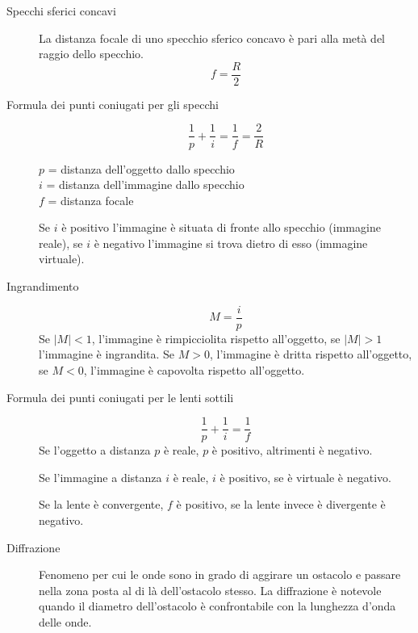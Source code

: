 \documentclass[a4paper,11pt,italian]{article}
\begin{document}
\begin{description}
  \item[Specchi sferici concavi] 
  La distanza focale di uno specchio sferico concavo è pari alla metà del raggio dello specchio.
  \[ f = \frac{R}{2} \]
  
  \item[Formula dei punti coniugati per gli specchi]
  \[ \frac{1}{p} +\frac{1}{i} = \frac{1}{f} = \frac{2}{R} \]
  \begin{multicols}{2}
  $ p $ = distanza dell'oggetto dallo specchio\\
  $ i $ = distanza dell'immagine dallo specchio\\
  $ f $ = distanza focale
  \end{multicols}
  Se $ i $ è positivo l'immagine è situata di fronte allo specchio (immagine reale), se $ i $ è negativo l'immagine si trova dietro di esso (immagine virtuale).
  
  \item[Ingrandimento]
  \[ M = \frac{i}{p} \]
  Se $ |M| < 1$, l'immagine è rimpicciolita rispetto all'oggetto, se $ |M| >1 $ l'immagine è ingrandita. Se $ M > 0 $, l'immagine è dritta rispetto all'oggetto, se $ M<0 $, l'immagine è capovolta rispetto all'oggetto.
  
  \item[Formula dei punti coniugati per le lenti sottili]
  \[ \frac{1}{p} +\frac{1}{i} = \frac{1}{f} \]
  Se l'oggetto a distanza $ p $ è reale, $ p $ è positivo, altrimenti è negativo.
  
  Se l'immagine a distanza $ i $ è reale, $ i $ è positivo, se è virtuale è negativo.
  
  Se la lente è convergente, $ f $ è positivo, se la lente invece è divergente è negativo.

%   
  
  \item[Diffrazione] 
  Fenomeno per cui le onde sono in grado di aggirare un ostacolo e passare nella zona posta al di là dell'ostacolo stesso. La diffrazione è notevole quando il diametro dell'ostacolo è confrontabile con la lunghezza d'onda delle onde.
  

\end{description}
\end{document}
